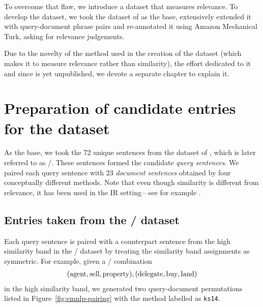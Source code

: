 To overcome that flaw, we introduce a dataset that measures relevance. To develop the dataset, we took the  dataset of  as the base, extensively extended it with query-document phrase pairs and re-annotated it using Amazon Mechanical Turk, asking for relevance judgements.

Due to the novelty of the method used in the creation of the dataset (which makes it to measure relevance rather than similarity), the effort dedicated to it and since is yet unpublished, we devote a separate chapter to explain it.

\section{Preparation of candidate entries for the dataset}
\label{sec:design}

As the base, we took the 72 unique sentences from the dataset of , which is later referred to as \emnlp/.\footnotemark{} These sentences formed the candidate \emph{query sentences}. We paired each query sentence with 23 \emph{document sentences} obtained by four conceptually different methods. Note that even though similarity is different from relevance, it has been used in the IR setting---see for example .
%



\subsection{Entries taken from the \emnlp/ dataset}

Each query sentence is paired with a counterpart sentence from the high similarity band\footnotemark{} in the \emnlp/ dataset by treating the similarity band assignments as symmetric. For example, given a \emnlp/ combination
%
%
\begin{eqnarray*}
(\textmd{agent}, \textmd{sell}, \textmd{property}),
(\textmd{delegate}, \textmd{buy}, \textmd{land})
\end{eqnarray*}
%
in the high similarity band, we generated two query-document permutations listed
in Figure~\ref{fig:emnlp-pairing} with the method labelled as \texttt{ks14}.

